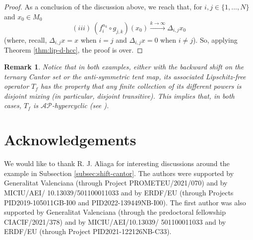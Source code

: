 \documentclass[11pt,reqno]{article}
\newtheorem{remark}[statement]{Remark}
\def\eor{\hfill{\circledR}}
\begin{document}
\begin{proof}
As a conclusion of the discussion above, we reach that, for $i,j\in \{1,...,N\}$ and $x_0 \in M_0$
  \[ (iii) \ (f_{i}^{n_k} \circ g_{j,k}) (x_0) \xrightarrow{k\to \infty } \Delta_{i,j} x_0\]
  (where, recall, $\Delta_{i,j} x= x$ when $i=j$ and $\Delta_{i,j}x=0$ when $i\neq j$). So, applying Theorem \ref{thm:lip-d-hcc}, the proof is over.

\end{proof}

\begin{remark}
    Notice that in both examples, either with the backward shift on the ternary Cantor set or the anti-symmetric tent map, its associated Lipschitz-free operator $T_f$ has the property that any finite collection of its different powers is disjoint mixing (in particular, disjoint transitive). This implies that, in both cases, $T_f$ is $\mathcal{AP}$-hypercyclic (see \cite{CaMu22}).
    \eor
\end{remark}
    


  





 \section*{Acknowledgements}
We would like to thank R. J. Aliaga for interesting discussions around the example in Subsection \ref{subsec:shift-cantor}. The authors were supported by  Generalitat Valenciana (through Project PROMETEU/2021/070) and by MICIU/AEI/
10.13039/501100011033 and by ERDF/EU (through Projects PID2019-105011GB-I00 and PID2022-139449NB-I00). The first author was also supported by Generalitat Valenciana (through the predoctoral fellowship CIACIF/2021/378) and by MICIU/AEI/10.13039/
501100011033 and by ERDF/EU (through Project PID2021-122126NB-C33).


\printbibliography
\end{document}
